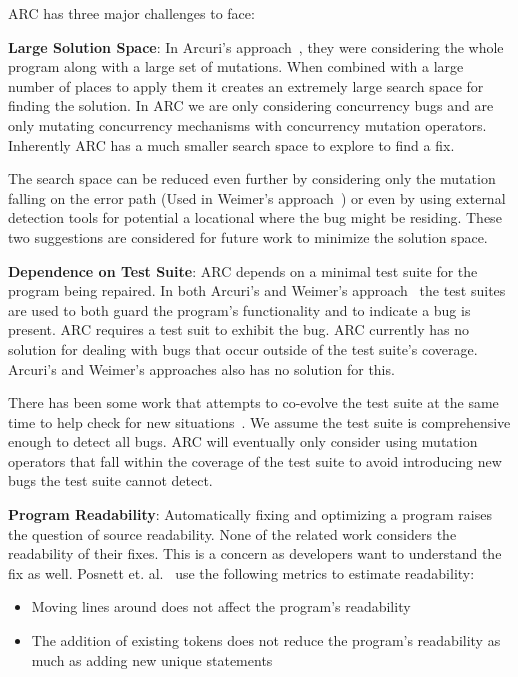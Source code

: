 \documentclass{llncs}
\begin{document}
ARC has three major challenges to face:

\textbf{Large Solution Space}: In Arcuri's approach~\cite{AY08}, they were
considering the whole program along with a large set of mutations. When
combined with a large number of places to apply them it creates an extremely
large search space for finding the solution. In ARC we are only considering
concurrency bugs and are only mutating concurrency mechanisms with concurrency
mutation operators. Inherently ARC has a much smaller search space to explore
to find a fix.

The search space can be reduced even further by considering only the mutation
falling on the error path (Used in Weimer's approach~\cite{GNFW11}) or even by
using external detection tools for potential a locational where the bug might
be residing. These two suggestions are considered for future work to minimize
the solution space.

\textbf{Dependence on Test Suite}: ARC depends on a minimal test suite for the
program being repaired. In both Arcuri's and Weimer's
approach~\cite{AY08,GNFW11} the test suites are used to both guard the
program's functionality and to indicate a bug is present. ARC requires a test
suit to exhibit the bug. ARC currently has no solution for dealing with bugs
that occur outside of the test suite's coverage. Arcuri's and Weimer's
approaches also has no solution for this.

There has been some work that attempts to co-evolve the test suite at the same
time to help check for new situations~\cite{WT10}. We assume the
test suite is comprehensive enough to detect all bugs. ARC will eventually only
consider using mutation operators that fall within the coverage of the test
suite to avoid introducing new bugs the test suite cannot detect.

\textbf{Program Readability}: Automatically fixing and optimizing a program
raises the question of source readability. None of the related work considers
the readability of their fixes. This is a concern as developers want to
understand the fix as well. Posnett et. al.~\cite{PHD11} use the following
metrics to estimate readability:

\begin{itemize}
  \item Moving lines around does not affect the program's readability
  \item The addition of existing tokens does not reduce the program's
readability as much as adding new unique statements
\end{itemize}
\end{document}
